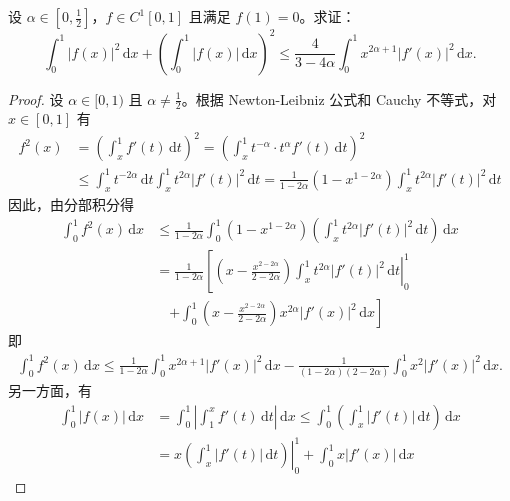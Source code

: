 \documentclass[../../main.tex]{subfiles}%
\begin{document}
\begin{example}
设 \( \alpha \in \left[0, \frac{1}{2}\right] \)，\( f \in C^1[0,1] \) 且满足 \( f(1) = 0 \)。求证：
\[
\int_{0}^{1} |f(x)|^2 \, \mathrm{d}x + \left( \int_{0}^{1} |f(x)| \, \mathrm{d}x \right)^2 \leqslant \frac{4}{3 - 4\alpha} \int_{0}^{1} x^{2\alpha + 1} |f'(x)|^2 \, \mathrm{d}x.
\]
\end{example}
\begin{proof}

设 \( \alpha \in [0,1) \) 且 \( \alpha \neq \frac{1}{2} \)。根据 Newton-Leibniz 公式和 Cauchy 不等式，对 \( x \in [0,1] \) 有
\begin{align*}
f^2(x) &= \left( \int_{x}^{1} f'(t) \, \mathrm{d}t \right)^2 = \left( \int_{x}^{1} t^{-\alpha} \cdot t^{\alpha} f'(t) \, \mathrm{d}t \right)^2 \\
&\leqslant \int_{x}^{1} t^{-2\alpha} \, \mathrm{d}t \int_{x}^{1} t^{2\alpha} |f'(t)|^2 \, \mathrm{d}t = \frac{1}{1 - 2\alpha} (1 - x^{1 - 2\alpha}) \int_{x}^{1} t^{2\alpha} |f'(t)|^2 \, \mathrm{d}t
\end{align*}
因此，由分部积分得
\begin{align*}
\int_{0}^{1} f^2(x) \, \mathrm{d}x &\leqslant \frac{1}{1 - 2\alpha} \int_{0}^{1} (1 - x^{1 - 2\alpha}) \left( \int_{x}^{1} t^{2\alpha} |f'(t)|^2 \, \mathrm{d}t \right) \, \mathrm{d}x \\
&= \frac{1}{1 - 2\alpha} \left[ \left. \left( x - \frac{x^{2 - 2\alpha}}{2 - 2\alpha} \right) \int_{x}^{1} t^{2\alpha} |f'(t)|^2 \, \mathrm{d}t \right|_{0}^{1} \right. \\
&\quad \left. + \int_{0}^{1} \left( x - \frac{x^{2 - 2\alpha}}{2 - 2\alpha} \right) x^{2\alpha} |f'(x)|^2 \, \mathrm{d}x \right]
\end{align*}
即
\begin{align}
\int_{0}^{1} f^2(x) \, \mathrm{d}x \leqslant \frac{1}{1 - 2\alpha} \int_{0}^{1} x^{2\alpha + 1} |f'(x)|^2 \, \mathrm{d}x - \frac{1}{(1 - 2\alpha)(2 - 2\alpha)} \int_{0}^{1} x^2 |f'(x)|^2 \, \mathrm{d}x .\label{eq:::23523523424jrioj5335}
\end{align}
另一方面，有
\begin{align*}
\int_{0}^{1} |f(x)| \, \mathrm{d}x &= \int_{0}^{1} \left| \int_{1}^{x} f'(t) \, \mathrm{d}t \right| \, \mathrm{d}x \leqslant \int_{0}^{1} \left( \int_{x}^{1} |f'(t)| \, \mathrm{d}t \right) \, \mathrm{d}x \\
&= \left. x \left( \int_{x}^{1} |f'(t)| \, \mathrm{d}t \right) \right|_{0}^{1} + \int_{0}^{1} x |f'(x)| \, \mathrm{d}x
\end{align*}

\end{proof}
\end{document}
